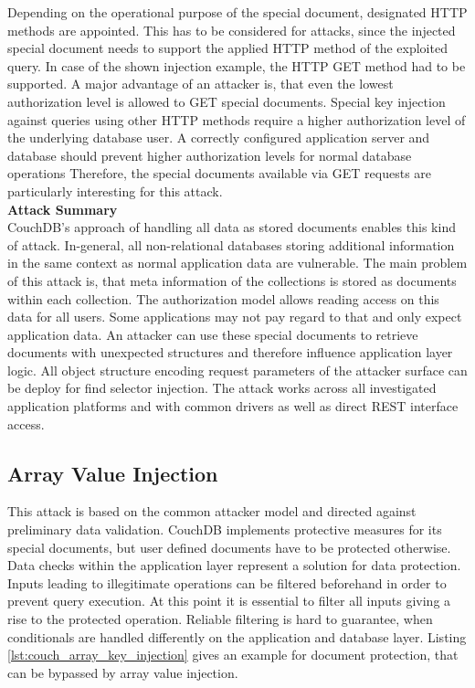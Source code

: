 Depending on the operational purpose of the special document, designated HTTP methods are appointed. This has to be considered for attacks, since the injected special document needs to support the applied HTTP method of the exploited query. In case of the shown injection example, the HTTP GET method had to be supported. A major advantage of an attacker is, that even the lowest authorization level is allowed to GET special documents. Special key injection against queries using other HTTP methods require a higher authorization level of the underlying database user. A correctly configured application server and database should prevent higher authorization levels for normal database operations Therefore, the special documents available via GET requests are particularly interesting for this attack. \\

\textbf{Attack Summary} \\
CouchDB's approach of handling all data as stored documents enables this kind of attack. In-general, all non-relational databases storing additional information in the same context as normal application data are vulnerable. The main problem of this attack is, that meta information of the collections is stored as documents within each collection. The authorization model allows reading access on this data for all users. Some applications may not pay regard to that and only expect application data. An attacker can use these special documents to retrieve documents with unexpected structures and therefore influence application layer logic. All object structure encoding request parameters of the attacker surface can be deploy for find selector injection. The attack works across all investigated application platforms and with common drivers as well as direct REST interface access. 

\subsection{Array Value Injection}
This attack is based on the common attacker model and directed against preliminary data validation. CouchDB implements protective measures for its special documents, but user defined documents have to be protected otherwise. Data checks within the application layer represent a solution for data protection. Inputs leading to illegitimate operations can be filtered beforehand in order to prevent query execution. At this point it is essential to filter all inputs giving a rise to the protected operation. Reliable filtering is hard to guarantee, when conditionals are handled differently on the application and database layer. Listing \ref{lst:couch_array_key_injection} gives an example for document protection, that can be bypassed by array value injection.\\

